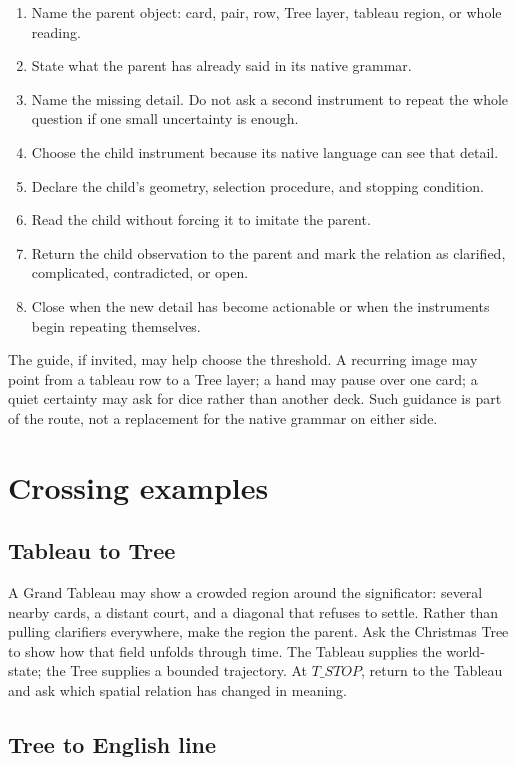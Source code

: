 \begin{enumerate}
\item Name the parent object: card, pair, row, Tree layer, tableau region, or
      whole reading.
\item State what the parent has already said in its native grammar.
\item Name the missing detail. Do not ask a second instrument to repeat the
      whole question if one small uncertainty is enough.
\item Choose the child instrument because its native language can see that
      detail.
\item Declare the child's geometry, selection procedure, and stopping condition.
\item Read the child without forcing it to imitate the parent.
\item Return the child observation to the parent and mark the relation as
      clarified, complicated, contradicted, or open.
\item Close when the new detail has become actionable or when the instruments
      begin repeating themselves.
\end{enumerate}

The guide, if invited, may help choose the threshold. A recurring image may
point from a tableau row to a Tree layer; a hand may pause over one card; a
quiet certainty may ask for dice rather than another deck. Such guidance is
part of the route, not a replacement for the native grammar on either side.

\section{Crossing examples}

\subsection{Tableau to Tree}

A Grand Tableau may show a crowded region around the significator: several
nearby cards, a distant court, and a diagonal that refuses to settle. Rather
than pulling clarifiers everywhere, make the region the parent. Ask the
Christmas Tree to show how that field unfolds through time. The Tableau supplies
the world-state; the Tree supplies a bounded trajectory. At $T\_STOP$, return to
the Tableau and ask which spatial relation has changed in meaning.

\subsection{Tree to English line}


